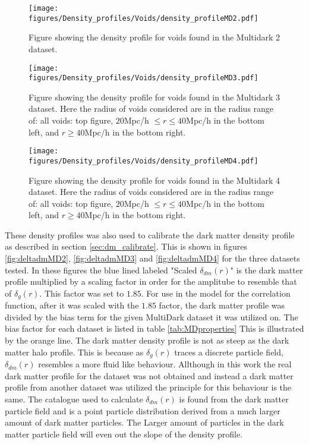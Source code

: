 \begin{figure}[H]
    \texttt{[image: figures/Density\_profiles/Voids/density\_profileMD2.pdf]}
    \caption{Figure showing the density profile for voids found in the Multidark 2 dataset.}
    \label{fig:deltaMD2}
\end{figure}
\begin{figure}[H]
    \texttt{[image: figures/Density\_profiles/Voids/density\_profileMD3.pdf]}
    \caption{Figure showing the density profile for voids found in the Multidark 3 dataset. Here the radius of voids considered are in the radius range of: all voids: top figure, $20$Mpc/h $\leq r\leq 40$Mpc/h in the bottom left, and $r\geq 40$Mpc/h in the bottom right.}
    \label{fig:deltaMD3}
\end{figure}
\begin{figure}[H]
    \texttt{[image: figures/Density\_profiles/Voids/density\_profileMD4.pdf]}
    \caption{Figure showing the density profile for voids found in the Multidark 4 dataset. Here the radius of voids considered are in the radius range of: all voids: top figure, $20$Mpc/h $\leq r\leq 40$Mpc/h in the bottom left, and $r\geq 40$Mpc/h in the bottom right.}
    \label{fig:deltaMD4}
\end{figure}
These density profiles was also used to calibrate the dark matter density profile as described in section \ref{sec:dm_calibrate}. This is shown in figures \ref{fig:deltadmMD2}, \ref{fig:deltadmMD3} and \ref{fig:deltadmMD4} for the three datasets tested.
In these figures the blue lined labeled "Scaled $\delta_{dm}(r)$" is the dark matter profile multiplied by a scaling factor in order for the amplitube to resemble that of $\delta_g(r)$. This factor was set to $1.85$. For use in the model for the correlation function, after it was scaled with the $1.85$ factor, the dark matter profile was divided by the bias term for the given MultiDark dataset it was utilized on. The bias factor for each dataset is listed in table \ref{tab:MDproperties} This is illustrated by the orange line.
The dark matter density profile is not as steep as the dark matter halo profile. This is because as $\delta_g(r)$ traces a discrete particle field, $\delta_{dm}(r)$ resembles a more fluid like behaviour. Allthough in this work the real dark matter profile for the dataset was not obtained and instead a dark matter profile from another dataset was utilized the principle for this behaviour is the same. The catalogue used to calculate $\delta_{dm}(r)$ is found from the dark matter particle field and is a point particle distribution derived from a much larger amount of dark matter particles. The Larger amount of particles in the dark matter particle field will even out the slope of the density profile.\\\indent 

